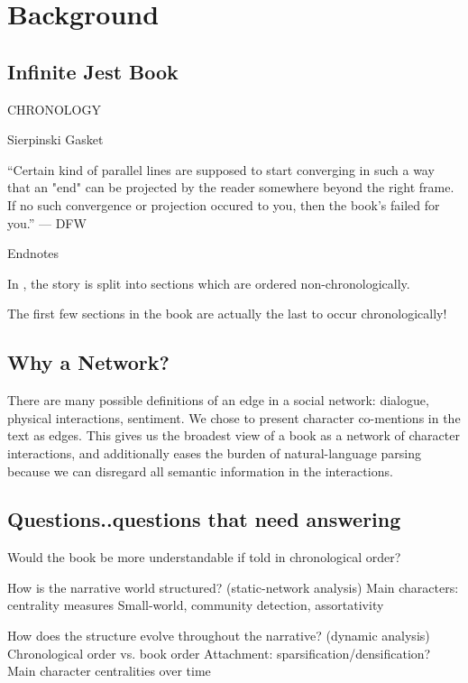 \section{Background}

\subsection{Infinite Jest Book}

CHRONOLOGY

Sierpinski Gasket

“Certain kind of parallel lines are supposed to start converging in such a way that an "end" can be projected by the reader somewhere beyond the right frame. If no such convergence or projection occured to you, then the book's failed for you.” — DFW

Endnotes

In \infinitejest, the story is split into sections which are ordered non-chronologically. 

The first few sections in the book are actually the last to occur chronologically!

\subsection{Why a Network?}

There are many possible definitions of an edge in a social network: dialogue, physical interactions, sentiment. 
We chose to present character co-mentions in the text as edges. 
This gives us the broadest view of a book as a network of character interactions, and additionally eases the burden of natural-language parsing because we can disregard all semantic information in the interactions.

\subsection{Questions..questions that need answering}

Would the book be more understandable if told in chronological order?

How is the narrative world structured? (static-network analysis)
Main characters: centrality measures
Small-world, community detection, assortativity


How does the structure evolve throughout the narrative? (dynamic analysis)
Chronological order vs. book order
Attachment: sparsification/densification?
Main character centralities over time



